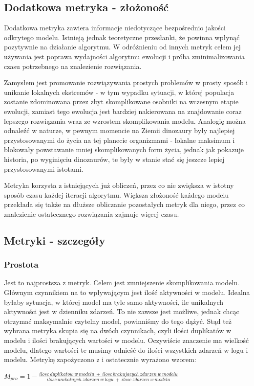 \subsection{Dodatkowa metryka - złożoność}
\label{sec:additional-metric-complexity}
Dodatkowa metryka zawiera informacje niedotyczące bezpośrednio jakości odkrytego modelu. Istnieją jednak  teoretyczne przesłanki, że powinna wpłynąć pozytywnie na działanie algorytmu. W odróżnieniu od innych metryk celem jej używania jest poprawa wydajności algorytmu ewolucji i próba zminimalizowania czasu potrzebnego na znalezienie rozwiązania.
 
Zamysłem jest promowanie rozwiązywania prostych problemów w prosty sposób i unikanie lokalnych ekstremów - w tym wypadku sytuacji, w której populacja zostanie zdominowana przez zbyt skomplikowane osobniki na wczesnym etapie ewolucji, zamiast tego ewolucja jest bardziej nakierowana na znajdowanie coraz lepszego rozwiązania wraz ze wzrostem skomplikowania modelu. Analogię można odnaleźć w naturze, w pewnym momencie na Ziemii dinozaury były najlepiej przystosowanymi do życia na tej planecie organizmami - lokalne maksimum i blokowały powstawanie mniej skomplikowanych form życia, jednak jak pokazuje historia, po wyginięciu dinozaurów, te były w stanie stać się jeszcze lepiej przystosowanymi istotami.

Metryka korzysta z istniejących już obliczeń, przez co nie zwiększa w istotny sposób czasu każdej iteracji algorytmu. Większa złożoność każdego modelu przekłada się także na dłuższe obliczanie pozostałych metryk dla niego, przez co znalezienie ostatecznego rozwiązania zajmuje więcej czasu.


\subsection{Metryki - szczegóły}
\label{sec:metrics-details}
\subsubsection{Prostota}  
Jest to najprostsza z metryk. Celem jest zmniejszenie skomplikowania modelu. Głównym czynnikiem na to wpływającym jest ilość aktywności w modelu. Idealna byłaby sytuacja, w której model ma tyle samo aktywności, ile unikalnych aktywności jest w dzienniku zdarzeń. To nie zawsze jest możliwe, jednak chcąc otrzymać maksymalnie czytelny model, powinniśmy do tego dążyć. Stąd też wybrana metryka skupia się na dwóch czynnikach, czyli ilości duplikatów w modelu i ilości brakujących wartości w modelu. Oczywiście znaczenie ma wielkość modelu, dlatego wartości te musimy odnieść do ilości wszystkich zdarzeń w logu i modelu. Metrykę zapożyczono z \cite{qd-in-discovery} i ostatecznie wyrażono wzorem: \begin{center}
$M_{pro} = 1 - \frac{ilosc\ duplikatow\ w\ modelu\ +\ ilosc\ brakujacych\ zdarzen\ w\ modelu}{ilosc\ unikalnych\ zdarzen\ w\ logu\ +\ ilosc\ zdarzen\ w\ modelu}$
\end{center}
